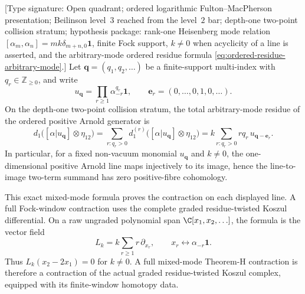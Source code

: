 \begin{proposition}
\label{prop:heisenberg-two-point-mixed-mode-residue-formula}
\textup{[Type signature: Open quadrant; ordered logarithmic
Fulton--MacPherson presentation; Beilinson level~$3$ reached from the
level~$2$ bar; depth-one two-point collision stratum; hypothesis
package: rank-one Heisenberg mode relation
\([\alpha_m,\alpha_n]=mk\delta_{m+n,0}\mathbf1\), finite Fock
support, \(k\neq0\) when acyclicity of a line is asserted, and the
arbitrary-mode ordered residue formula
\eqref{eq:ordered-residue-arbitrary-mode}.]}
Let \(\mathbf q=(q_1,q_2,\ldots)\) be a finite-support multi-index
with \(q_r\in\mathbb Z_{\ge0}\), and write
\[
 u_{\mathbf q}
 =
 \prod_{r\ge1}\alpha_{-r}^{q_r}\mathbf1,
 \qquad
 \mathbf e_r=(0,\ldots,0,1,0,\ldots).
\]
On the depth-one two-point collision stratum, the total
arbitrary-mode residue of the ordered positive Arnold generator is
\[
 d_1\bigl([\alpha|u_{\mathbf q}]\otimes\eta_{12}\bigr)
 =
 \sum_{r:q_r>0}
 d_1^{(r)}\bigl([\alpha|u_{\mathbf q}]\otimes\eta_{12}\bigr)
 =
 k\sum_{r:q_r>0} r q_r\,u_{\mathbf q-\mathbf e_r}.
\]
In particular, for a fixed non-vacuum monomial \(u_{\mathbf q}\) and
\(k\neq0\), the one-dimensional positive Arnold line maps
injectively to its image, hence the line-to-image two-term summand has
zero positive-fibre cohomology.

This exact mixed-mode formula proves the contraction on each displayed
line.  A full Fock-window contraction uses the complete graded
residue-twisted Koszul differential.  On a raw ungraded polynomial span
\(\C[x_1,x_2,\ldots]\), the formula is the vector field
\[
 L_k=k\sum_{r\ge1}r\,\partial_{x_r},
 \qquad
 x_r\leftrightarrow \alpha_{-r}\mathbf1 .
\]
Thus \(L_k(x_2-2x_1)=0\) for \(k\neq0\).  A full mixed-mode
Theorem-H contraction is therefore a contraction of the actual graded
residue-twisted Koszul complex, equipped with its finite-window
homotopy data.
\end{proposition}

